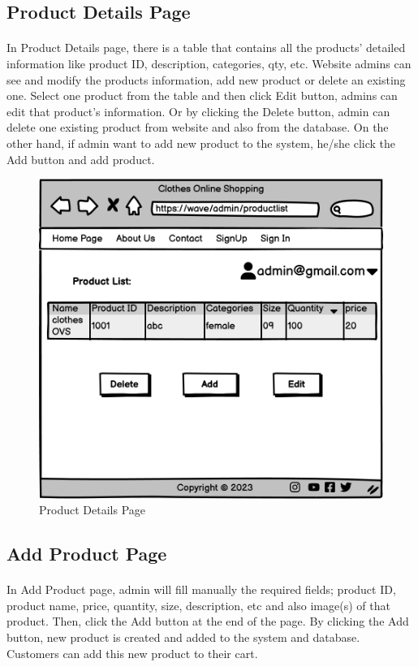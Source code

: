 \subsection{Product Details Page}
\bigskip
\paragraph{}
In Product Details page, there is a table that contains all the products' detailed information like product ID, description, categories, qty, etc. Website admins can see and modify the products information, add new product or delete an existing one. Select one product from the table and then click Edit button, admins can edit that product's information. Or by clicking the Delete button, admin can delete one existing product from website and also from the database. On the other hand, if admin want to add new product to the system, he/she click the Add button and add product.
\bigskip
\bigskip
\bigskip
\begin{figure}[h]
\centerline{\includegraphics[scale=1.]{images/Product Details.png}}
\caption{Product Details Page}
\label{fig}
\end{figure}

\newpage
\subsection{Add Product Page}
\bigskip
\paragraph{}
In Add Product page, admin will fill manually the required fields; product ID, product name, price, quantity, size, description, etc and also image(s) of that product. Then, click the Add button at the end of the page. By clicking the Add button, new product is created and added to the system and database. Customers can add this new product to their cart. 

